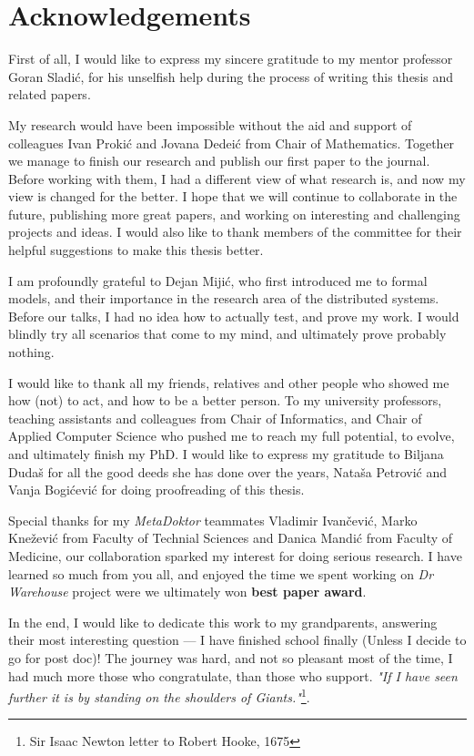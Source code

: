 \chapter*{Acknowledgements}
First of all, I would like to express my sincere gratitude to my mentor professor Goran Sladi\'c, for his unselfish help during the process of writing this thesis and related papers.

My research would have been impossible without the aid and support of colleagues Ivan Proki\'c and Jovana Dedei\'c from Chair of Mathematics. Together we manage to finish our research and publish our first paper to the journal. Before working with them, I had a different view of what research is, and now my view is changed for the better. I hope that we will continue to collaborate in the future, publishing more great papers, and working on interesting and challenging projects and ideas. I would also like to thank members of the committee for their helpful suggestions to make this thesis better.

I am profoundly grateful to Dejan Miji\'c, who first introduced me to formal models, and their importance in the research area of the distributed systems. Before our talks, I had no idea how to actually test, and prove my work. I would blindly try all scenarios that come to my mind, and ultimately prove probably nothing.

I would like to thank all my friends, relatives and other people who showed me how (not) to act, and how to be a better person. To my university professors, teaching assistants and colleagues from Chair of Informatics, and Chair of Applied Computer Science who pushed me to reach my full potential, to evolve, and ultimately finish my PhD. I would like to express my gratitude to Biljana Duda\v s for all the good deeds she has done over the years, Nata\v sa Petrovi\'c and Vanja Bogi\'cevi\'c for doing proofreading of this thesis. 

Special thanks for my \emph{MetaDoktor} teammates Vladimir Ivan\v cevi\'c, Marko Kne\v zevi\'c from Faculty of Technial Sciences and Danica Mandi\'c from Faculty of Medicine, our collaboration sparked my interest for doing serious research. I have learned so much from you all, and enjoyed the time we spent working on \emph{Dr Warehouse} project were we ultimately won \textbf{best paper award}.

In the end, I would like to dedicate this work to my grandparents, answering their most interesting question --- I have finished school finally (Unless I decide to go for post doc)! The journey was hard, and not so pleasant most of the time, I had much more those who congratulate, than those who support. \emph{"If I have seen further it is by standing on the shoulders of Giants."}\footnote{Sir Isaac Newton letter to Robert Hooke, 1675}.